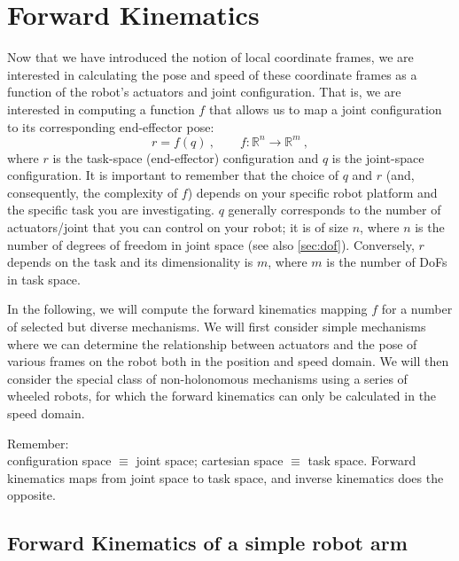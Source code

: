 \section{Forward Kinematics}\label{sec:kinematics:fwkarm}

Now that we have introduced the notion of local coordinate frames, we are interested in calculating the pose and speed of these coordinate frames as a function of the robot's actuators and joint configuration.
That is, we are interested in computing a function $f$ that allows us to map a joint configuration to its corresponding end-effector pose:
\begin{equation}\label{eq:kinematics:forward}
r=f(q)\ , \qquad f : \mathbb{R}^n \rightarrow \mathbb{R}^m \ ,
\end{equation}
where $r$ is the task-space (end-effector) configuration and $q$ is the joint-space configuration.
It is important to remember that the choice of $q$ and $r$ (and, consequently, the complexity of $f$) depends on your specific robot platform and the specific task you are investigating.
$q$ generally corresponds to the number of actuators/joint that you can control on your robot; it is of size $n$, where $n$ is the number of degrees of freedom in joint space (see also \cref{sec:dof}).
Conversely, $r$ depends on the task and its dimensionality is $m$, where $m$ is the number of DoFs in task space.

In the following, we will compute the forward kinematics mapping $f$ for a number of selected but diverse mechanisms.
We will first consider simple mechanisms where we can determine the relationship between actuators and the pose of various frames on the robot both in the position and speed domain.
We will then consider the special class of non-holonomous mechanisms using a series of wheeled robots, for which the forward kinematics can only be calculated in the speed domain.

\begin{framed}
\noindent Remember:\\
configuration space $\equiv$ joint space;
cartesian space $\equiv$ task space.
Forward kinematics maps from joint space to task space, and inverse kinematics does the opposite.
\end{framed}

\subsection{Forward Kinematics of a simple robot arm}

